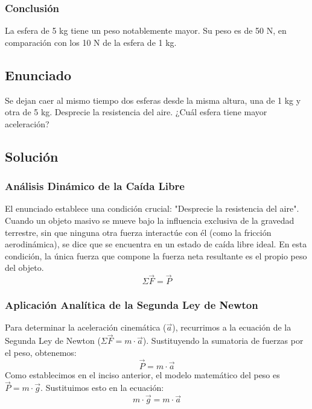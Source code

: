 \documentclass[12pt]{article}
\begin{document}
\subsubsection*{Conclusión}
La esfera de 5 kg tiene un peso notablemente mayor. Su peso es de 50 N, en comparación con los 10 N de la esfera de 1 kg.

\newpage

\subsection*{Enunciado}
Se dejan caer al mismo tiempo dos esferas desde la misma altura, una de 1 kg y otra de 5 kg. Desprecie la resistencia del aire. ¿Cuál esfera tiene mayor aceleración?

\subsection*{Solución}

\subsubsection*{Análisis Dinámico de la Caída Libre}
El enunciado establece una condición crucial: "Desprecie la resistencia del aire". Cuando un objeto masivo se mueve bajo la influencia exclusiva de la gravedad terrestre, sin que ninguna otra fuerza interactúe con él (como la fricción aerodinámica), se dice que se encuentra en un estado de caída libre ideal. En esta condición, la única fuerza que compone la fuerza neta resultante es el propio peso del objeto.
\begin{equation}
    \Sigma \vec{F} = \vec{P}
\end{equation}

\subsubsection*{Aplicación Analítica de la Segunda Ley de Newton}
Para determinar la aceleración cinemática ($\vec{a}$), recurrimos a la ecuación de la Segunda Ley de Newton ($\Sigma \vec{F} = m \cdot \vec{a}$). Sustituyendo la sumatoria de fuerzas por el peso, obtenemos:
\begin{equation}
    \vec{P} = m \cdot \vec{a}
\end{equation}
Como establecimos en el inciso anterior, el modelo matemático del peso es $\vec{P} = m \cdot \vec{g}$. Sustituimos esto en la ecuación:
\begin{equation}
    m \cdot \vec{g} = m \cdot \vec{a}
\end{equation}
\end{document}
